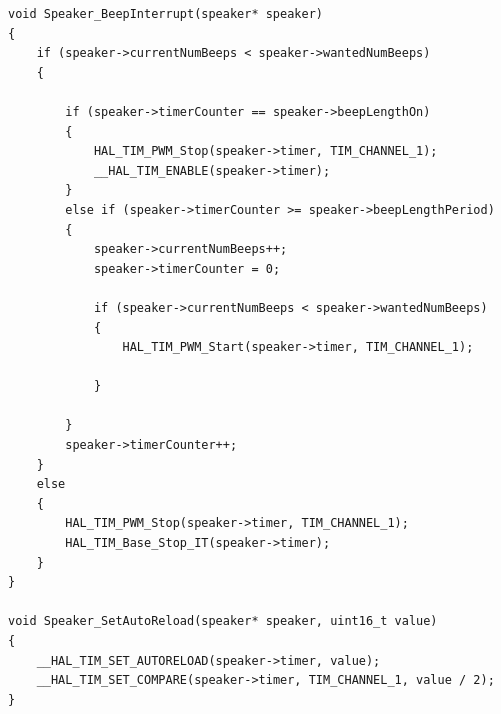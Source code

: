 \documentclass{article}
\begin{document}
\begin{lstlisting}[caption={STM32 Speaker Firmware Implementation}, label={lst:stm32_speaker_code}]
void Speaker_BeepInterrupt(speaker* speaker)
{
    if (speaker->currentNumBeeps < speaker->wantedNumBeeps)
    {

        if (speaker->timerCounter == speaker->beepLengthOn)
        {
            HAL_TIM_PWM_Stop(speaker->timer, TIM_CHANNEL_1);
            __HAL_TIM_ENABLE(speaker->timer);
        }
        else if (speaker->timerCounter >= speaker->beepLengthPeriod)
        {
        	speaker->currentNumBeeps++;
			speaker->timerCounter = 0;

            if (speaker->currentNumBeeps < speaker->wantedNumBeeps)
            {
                HAL_TIM_PWM_Start(speaker->timer, TIM_CHANNEL_1);

            }

        }
        speaker->timerCounter++;
    }
    else
    {
        HAL_TIM_PWM_Stop(speaker->timer, TIM_CHANNEL_1);
        HAL_TIM_Base_Stop_IT(speaker->timer);
    }
}

void Speaker_SetAutoReload(speaker* speaker, uint16_t value)
{
	__HAL_TIM_SET_AUTORELOAD(speaker->timer, value);
	__HAL_TIM_SET_COMPARE(speaker->timer, TIM_CHANNEL_1, value / 2);
}

\end{lstlisting}
\end{document}
